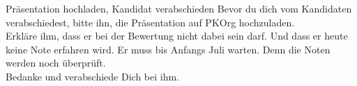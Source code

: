 \begin{taskitemwithoutcomment}{Präsentation hochladen, Kandidat verabschieden}
  Bevor du dich vom Kandidaten verabschiedest, bitte ihn, die Präsentation auf PKOrg hochzuladen.\\Erkläre ihm, dass er bei der Bewertung nicht dabei sein darf. Und dass er heute keine Note erfahren wird. Er muss bis Anfangs Juli warten. Denn die Noten werden noch überprüft.\\Bedanke und verabschiede Dich bei ihm.
\end{taskitemwithoutcomment}
